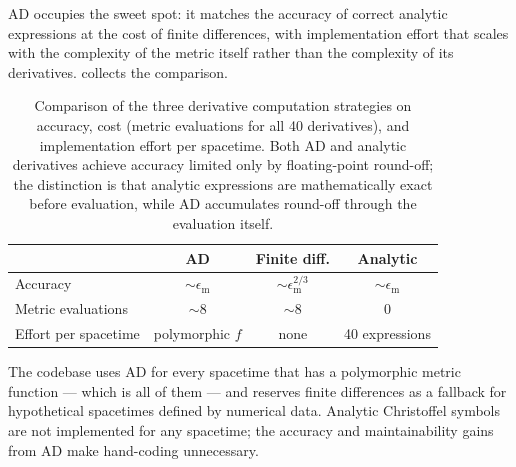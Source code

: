 AD occupies the sweet spot: it matches the accuracy of
correct analytic expressions at the cost of finite
differences, with implementation effort that scales with the
complexity of the metric itself rather than the complexity
of its derivatives.   collects the
comparison.
%
\begin{table}[t]
\centering
\caption[Derivative computation strategies compared]{%
  Comparison of the three derivative computation strategies
  on accuracy, cost (metric evaluations for all 40
  derivatives), and implementation effort per spacetime.
  Both AD and analytic derivatives achieve accuracy limited
  only by floating-point round-off; the distinction is that
  analytic expressions are mathematically exact before
  evaluation, while AD accumulates round-off through the
  evaluation itself.}
\label{tab:ad-comparison}
\small
\begin{tabular}{@{}lccc@{}}
  \toprule
  & \textbf{AD} & \textbf{Finite diff.} & \textbf{Analytic} \\
  \midrule
  Accuracy
    & $\sim\!\epsilon_{\text{m}}$
    & $\sim\!\epsilon_{\text{m}}^{2/3}$
    & $\sim\!\epsilon_{\text{m}}$ \\[3pt]
  Metric evaluations
    & $\sim\!8$
    & $\sim\!8$
    & $0$ \\[3pt]
  Effort per spacetime
    & polymorphic $f$
    & none
    & 40 expressions \\
  \bottomrule
\end{tabular}
\end{table}
%
The codebase uses AD for every spacetime that has a
polymorphic metric function --- which is all of them ---
and reserves finite differences as a fallback for
hypothetical spacetimes defined by numerical data.
Analytic Christoffel symbols are not implemented for any
spacetime; the accuracy and maintainability gains from AD
make hand-coding unnecessary.
